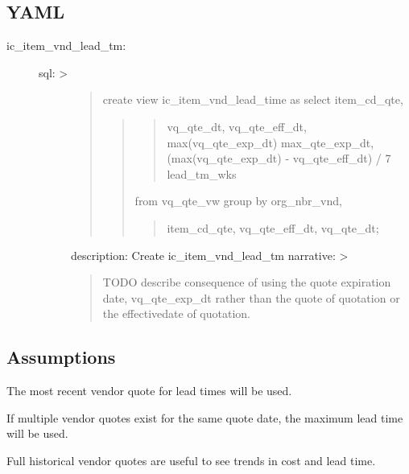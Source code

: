 \documentclass[letterpaper,10pt,english]{sphinxmanual}
\begin{document}
\subsection{YAML}
\label{\detokenize{450-MultipleLeadTimes2:yaml}}\begin{description}
\item[{ic\_item\_vnd\_lead\_tm:}] \leavevmode\begin{description}
\item[{sql: \textgreater{}}] \leavevmode\begin{quote}

create view ic\_item\_vnd\_lead\_time as
select item\_cd\_qte,
\begin{quote}
\begin{quote}

vq\_qte\_dt,
vq\_qte\_eff\_dt,
max(vq\_qte\_exp\_dt) max\_qte\_exp\_dt,
(max(vq\_qte\_exp\_dt) - vq\_qte\_eff\_dt) / 7 lead\_tm\_wks
\end{quote}

from vq\_qte\_vw
group by org\_nbr\_vnd,
\begin{quote}

item\_cd\_qte,
vq\_qte\_eff\_dt,
vq\_qte\_dt;
\end{quote}
\end{quote}
\end{quote}

description: Create ic\_item\_vnd\_lead\_tm
narrative: \textgreater{}
\begin{quote}

TODO describe consequence of using the quote expiration date, vq\_qte\_exp\_dt
rather than the quote of quotation or the effectivedate of quotation.
\end{quote}

\end{description}

\end{description}


\subsection{Assumptions}
\label{\detokenize{450-MultipleLeadTimes2:assumptions}}
The most recent vendor quote for lead times will be used.

If multiple vendor quotes exist for the same quote date, the maximum
lead time will be used.

Full historical vendor quotes are useful to see trends in cost and lead
time.
\end{document}
